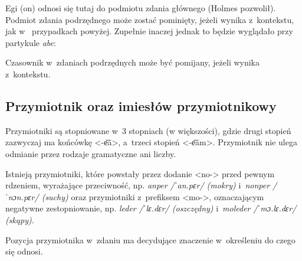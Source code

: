 \begin{spacing}{1.1}


Egi (on) odnosi się tutaj do podmiotu zdania głównego (Holmes pozwolił). Podmiot 
zdania podrzędnego może zostać pominięty, jeżeli wynika z~kontekstu, jak w~
przypadkach powyżej. Zupełnie inaczej jednak to będzie wyglądało przy partykule 
\emph{abe}:


Czasownik w~zdaniach podrzędnych może być pomijany, jeżeli wynika z~kontekstu.


\subsection{Przymiotnik oraz imiesłów przymiotnikowy}

Przymiotniki są stopniowane w~3 stopniach (w większości), gdzie drugi stopień 
zazwyczaj ma końcówkę <-e͞a>, a~trzeci stopień <-e͞am>. Przymiotnik nie ulega 
odmianie przez rodzaje gramatyczne ani liczby.

Istnieją przymiotniki, które powstały przez dodanie <no-> przed pewnym rdzeniem,
wyrażające przeciwność, np. \emph{anper /ˈan.pɛr/ (mokry)} i~\emph{nonper 
/ˈnɔn.pɛr/ (suchy)} oraz przymiotniki z~prefiksem <mo->, oznaczającym negatywne 
zestopniowanie, np. \emph{leder /ˈlɛ.dɛr/ (oszczędny)} i~\emph{moleder 
/ˈmɔ.lɛ.dɛr/ (skąpy)}.

Pozycja przymiotnika w~zdaniu ma decydujące znaczenie w~określeniu do czego się 
odnosi.






\end{spacing}
